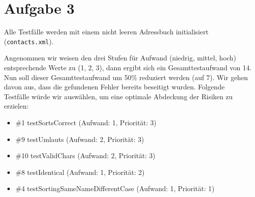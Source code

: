 \section*{Aufgabe 3}
Alle Testfälle werden mit einem nicht leeren Adressbuch initialisiert (\texttt{contacts.xml}).

Angenommen wir weisen den drei Stufen für Aufwand (niedrig, mittel, hoch) entsprechende Werte zu (1, 2, 3), dann ergibt sich ein Gesamttestaufwand von 14. Nun soll dieser Gesamttestaufwand um 50\% reduziert werden (auf 7). Wir gehen davon aus, dass die gefundenen Fehler bereits beseitigt wurden. Folgende Testfälle würde wir auswählen, um eine optimale Abdeckung der Risiken zu erzielen:

\begin{itemize}
\item \#1 testSortsCorrect (Aufwand: 1, Priorität: 3)
\item \#9 testUmlauts (Aufwand: 2, Priorität: 3)
\item \#10 testValidChars (Aufwand: 2, Priorität: 3)
\item \#8 testIdentical (Aufwand: 1, Priorität: 2)
\item \#4 testSortingSameNameDifferentCase (Aufwand: 1, Priorität: 1)
\end{itemize}
